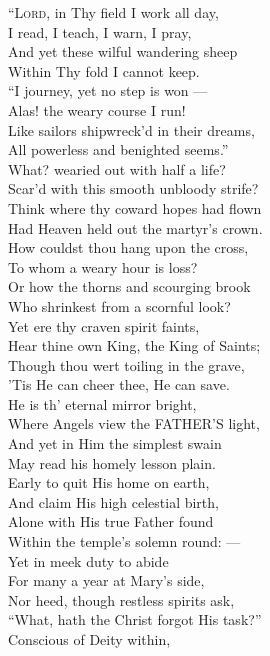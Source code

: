 “\textsc{Lord}, in Thy field I work all day, \\
 I read, I teach, I warn, I pray, \\
 And yet these wilful wandering sheep \\
 Within Thy fold I cannot keep. \\
  “I journey, yet no step is won — \\
 Alas! the weary course I run! \\
 Like sailors shipwreck’d in their dreams, \\
 All powerless and benighted seems.” \\
  What? wearied out with half a life? \\
 Scar’d with this smooth unbloody strife? \\
 Think where thy coward hopes had flown \\
 Had Heaven held out the martyr’s crown. \\
  How couldst thou hang upon the cross, \\
 To whom a weary hour is loss? \\
 Or how the thorns and scourging brook \\
 Who shrinkest from a scornful look? \\
  Yet ere thy craven spirit faints, \\
 Hear thine own King, the King of Saints; \\
 Though thou wert toiling in the grave, \\
 ’Tis He can cheer thee, He can save. \\
  He is th’ eternal mirror bright, \\
 Where Angels view the FATHER’S light, \\
 And yet in Him the simplest swain \\
 May read his homely lesson plain. \\
  Early to quit His home on earth, \\
 And claim His high celestial birth, \\
 Alone with His true Father found \\
 Within the temple’s solemn round: — \\
  Yet in meek duty to abide \\
 For many a year at Mary’s side, \\
 Nor heed, though restless spirits ask, \\
 “What, hath the Christ forgot His task?” \\
  Conscious of Deity within, \\
